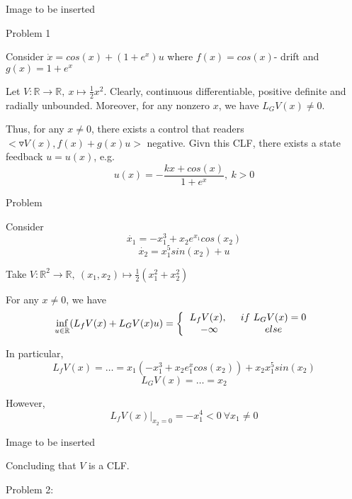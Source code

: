 Image to be inserted

Problem 1

Consider $\dot{x} = cos(x) + (1+e^x)u$ where $f(x) = cos(x)$- drift and $g(x) = 1+e^x$

Let $V: \mathbb{R} \to \mathbb{R}, \ x \mapsto \frac{1}{2}x^2$. Clearly, continuous differentiable, positive definite and radially unbounded. Moreover, for any nonzero $x$, we have $L_GV(x) \neq 0$. 

Thus, for any $x \neq 0$, there exists a control that readers $<\triangledown V(x), f(x) + g(x)u>$ negative. 
Givn this CLF, there exists a state feedback $u = u(x)$, e.g. 
\begin{equation*}
u(x) = - \frac{kx+cos(x)}{1+e^x}, \ k > 0
\end{equation*}

Problem

Consider 
\begin{equation*}
\dot{x_1} = -x_1^3 + x_2e^{x_1}cos(x_2)
\end{equation*}  
\begin{equation*}
\dot{x_2} = x_1^5sin(x_2) + u
\end{equation*}

Take $V: \mathbb{R}^2 \to \mathbb{R}, \ (x_1, x_2) \mapsto \frac{1}{2}(x_1^2 + x_2^2)$

For any $x \neq 0$, we have 
\begin{equation*}
\inf_{u \in \mathbb{R}}(L_fV(x) + L_GV(x)u) = 
\left \{ 
\begin{tabular}{cc} 
$L_fV(x), \ $ & $if\ L_GV(x) = 0$ \\ 
$- \infty$ & $else$ 
\end{tabular} 
\right.
\end{equation*}

In particular,
\begin{equation*}
L_fV(x) = \dots = x_1(-x_1^3 + x_2e^x_1 cos(x_2)) + x_2x_1^5sin(x_2)
\end{equation*}
\begin{equation*}
L_GV(x) = \dots = x_2
\end{equation*}

However, 
\begin{equation*}
L_fV(x)|_{x_2 = 0} = -x_1^4 < 0 \ \forall x_1 \neq 0
\end{equation*}

Image to be inserted

Concluding that $V$ is a CLF.

Problem 2:

